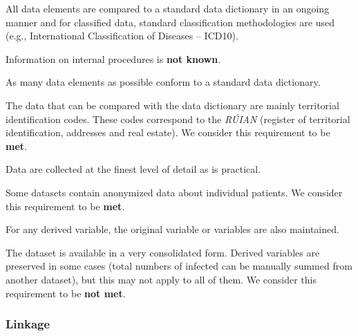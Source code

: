 \begin{QandA}
    \item All data elements are compared to a standard data dictionary in an ongoing manner and for classified data, standard classification methodologies are used (e.g., International Classification of Diseases – ICD10).
    \begin{answered}
        Information on internal procedures is \textbf{not known}.
    \end{answered}

    \item As many data elements as possible conform to a standard data dictionary.
    \begin{answered}
        The data that can be compared with the data dictionary are mainly territorial identification codes.
        These codes correspond to the \textit{RÚIAN} (register of territorial identification, addresses and real estate).
        We consider this requirement to be \textbf{met}.
    \end{answered}

    \item Data are collected at the finest level of detail as is practical.
    \begin{answered}
        Some datasets contain anonymized data about individual patients.
        We consider this requirement to be \textbf{met}.
    \end{answered}

    \item For any derived variable, the original variable or variables are also maintained.
    \begin{answered}
        The dataset is available in a very consolidated form.
        Derived variables are preserved in some cases (total numbers of infected can be manually summed from another dataset), but this may not apply to all of them.
        We consider this requirement to be \textbf{not met}.
    \end{answered}

\end{QandA}

\subsubsection{Linkage}

